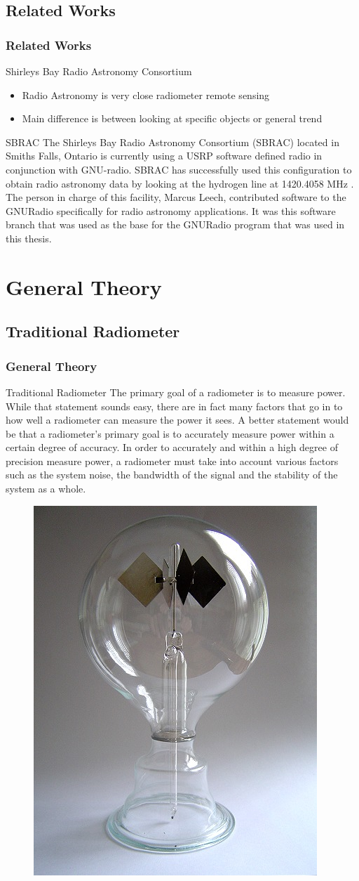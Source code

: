 \documentclass{beamer}
\begin{document}
\subsection{Related Works}
\begin{frame}
\frametitle{Related Works}
\begin{block}{Shirleys Bay Radio Astronomy Consortium}
\begin{itemize}
\item Radio Astronomy is very close radiometer remote sensing
\item Main difference is between looking at specific objects or general trend
\end{itemize}
\end{block}
\pause
\begin{block}{SBRAC}
The Shirleys Bay Radio Astronomy Consortium (SBRAC) located in Smiths Falls, Ontario is currently using a USRP software defined radio in conjunction with GNU-radio.  SBRAC has successfully used this configuration to obtain radio astronomy data by looking at the hydrogen line at 1420.4058 MHz \cite{Leech2007}.  The person in charge of this facility, Marcus Leech, contributed software to the GNURadio specifically for radio astronomy applications.  It was this software branch that was used as the base for the GNURadio program that was used in this thesis.
\end{block}
\end{frame}
\section{General Theory}
\subsection{Traditional Radiometer}
\begin{frame}
\frametitle{General Theory}
\begin{block}{Traditional Radiometer}
The primary goal of a radiometer is to measure power.  While that statement sounds easy, there are in fact many factors that go in to how well a radiometer can measure the power it sees.  A better statement would be that a radiometer's primary goal is to accurately measure power within a certain degree of accuracy.  In order to accurately and within a high degree of precision measure power, a radiometer must take into account various factors such as the system noise, the bandwidth of the signal and the stability of the system as a whole. 
\end{block}

\begin{figure}
\includegraphics[width=0.15\linewidth]{images/Crookes_radiometer.jpg}
\end{figure}
\end{frame}
\end{document}
